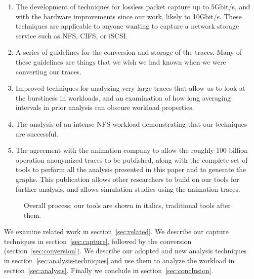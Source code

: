 \begin{enumerate}
\item The development of techniques for lossless packet capture up to
5Gbit/s, and with the hardware improvements since our work, likely to
10Gbit/s.  These techniques are applicable to anyone wanting to capture
a network storage service such as NFS, CIFS, or iSCSI.

\item A series of guidelines for the conversion and storage of the traces.
Many of these guidelines are things that we wish we had known when we
were converting our traces.

\item Improved techniques for analyzing very large traces that allow
us to look at the burstiness in workloads, and an examination of how
long averaging intervals in prior analysis can obscure workload
properties.

\item The analysis of an intense NFS workload demonstrating that our
techniques are successful.

\item The agreement with the animation company to allow the roughly
100 billion operation anonymized traces to be published, along with
the complete set of tools to perform all the analysis presented in
this paper and to generate the graphs.  This publication allows other
researchers to build on our tools for further analysis, and allows
simulation studies using the animation traces.
\end{enumerate}

\begin{figure}
\center {}
\caption{Overall process; our tools are shown in italics, traditional tools
after them.}
\label{fig:overall-process}
\end{figure}

We examine related work in section~\ref{sec:related}.  We describe our
capture techniques in section~\ref{sec:capture}, followed by the
conversion (section~\ref{sec:conversion}). We describe our adopted and
new analysis techniques in section~\ref{sec:analysis-techniques} and
use them to analyze the workload in section~\ref{sec:analysis}.
Finally we conclude in section~\ref{sec:conclusion}.
